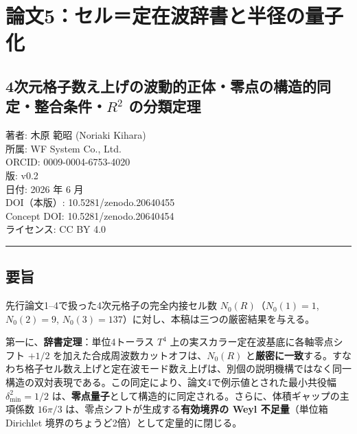 \documentclass[
]{ltjsarticle}
\author{}
\date{}
\begin{document}
\section{論文5：セル＝定在波辞書と半径の量子化}\label{ux8ad6ux65875ux30bbux30ebux5b9aux5728ux6ce2ux8f9eux66f8ux3068ux534aux5f84ux306eux91cfux5b50ux5316}

\subsection{\texorpdfstring{4次元格子数え上げの波動的正体・零点の構造的同定・整合条件・\(R^2\)
の分類定理}{4次元格子数え上げの波動的正体・零点の構造的同定・整合条件・R\^{}2 の分類定理}}\label{ux6b21ux5143ux683cux5b50ux6570ux3048ux4e0aux3052ux306eux6ce2ux52d5ux7684ux6b63ux4f53ux96f6ux70b9ux306eux69cbux9020ux7684ux540cux5b9aux6574ux5408ux6761ux4ef6r2-ux306eux5206ux985eux5b9aux7406}

著者: 木原 範昭 (Noriaki Kihara)\\
所属: WF System Co., Ltd.\\
ORCID: 0009-0004-6753-4020\\
版: v0.2\\
日付: 2026 年 6 月\\
DOI（本版）: 10.5281/zenodo.20640455\\
Concept DOI: 10.5281/zenodo.20640454\\
ライセンス: CC BY 4.0

\begin{center}\rule{0.5\linewidth}{0.5pt}\end{center}

\subsection{要旨}\label{ux8981ux65e8}

先行論文1--4で扱った4次元格子の完全内接セル数 \(N_0(R)\)（\(N_0(1)=1\),
\(N_0(2)=9\), \(N_0(3)=137\)）に対し、本稿は三つの厳密結果を与える。

第一に、\textbf{辞書定理}：単位4トーラス \(T^4\)
上の実スカラー定在波基底に各軸零点シフト \(+1/2\)
を加えた合成周波数カットオフは、\(N_0(R)\)
と\textbf{厳密に一致}する。すなわち格子セル数え上げと定在波モード数え上げは、別個の説明機構ではなく同一構造の双対表現である。この同定により、論文4で例示値とされた最小共役幅
\(\delta_{\min}^2=1/2\)
は、\textbf{零点量子}として構造的に同定される。さらに、体積ギャップの主項係数
\(16\pi/3\) は、零点シフトが生成する\textbf{有効境界の Weyl
不足量}（単位箱 Dirichlet 境界のちょうど2倍）として定量的に閉じる。
\end{document}
